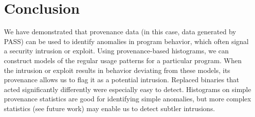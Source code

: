 \documentclass[10pt,twocolumn]{article}
\begin{document}
\section{Conclusion}
We have demonstrated that provenance data (in this case, data generated by PASS) can be used to identify anomalies in program behavior, which often signal a security intrusion or exploit. Using provenance-based histograms, we can construct models of the regular usage patterns for a particular program. When the intrusion or exploit results in behavior deviating from these models, its provenance allows us to flag it as a potential intrusion. Replaced binaries that acted significantly differently were especially easy to detect. Histograms on simple provenance statistics are good for identifying simple anomalies, but more complex statistics (see future work) may enable us to detect subtler intrusions.

%
\end{document}
